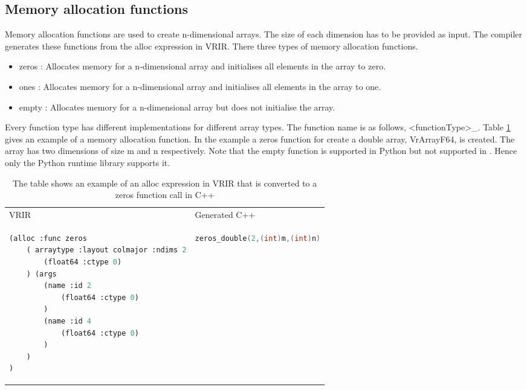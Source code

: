 \subsection{Memory allocation functions}
Memory allocation functions are used to create n-dimensional arrays. The size of each dimension has to be provided as input. The compiler generates these functions from the alloc expression in VRIR. There three types of memory allocation functions. 
\begin{itemize}
\item zeros : Allocates memory for a n-dimensional array and initialises all elements in the array to zero.
\item ones : Allocates memory for a n-dimensional array and initialises all elements in the array to one.
\item empty : Allocates memory for a n-dimensional array but does not initialise the array.
\end{itemize}
Every function type has different implementations for different array types. The function name is as follows, <functionType>\_<array type>. Table \ref{tab:allocFunc} gives an example of a memory allocation function. In the example a zeros function for create a \textsf{double} array, VrArrayF64, is created. The array has two dimensions of size \textsf{m} and \textsf{n} respectively. Note that the empty function is supported in Python but not supported in \matlab. Hence only the Python runtime library supports it.
\begin{table}[htbp]
\centering
\begin{tabular}{|l|l|}
\hline

VRIR &  Generated C++ \\
\hhline{|=|=|}
{
\begin{lstlisting}[language=lisp,frame=none, numbers=none]
(alloc :func zeros
	( arraytype :layout colmajor :ndims 2
		(float64 :ctype 0)
	) (args
		(name :id 2
			(float64 :ctype 0)
		)
		(name :id 4
			(float64 :ctype 0)
		)
	)
)
\end{lstlisting}
}
&
{
\begin{lstlisting}[language=c,frame=none, numbers=none]
 zeros_double(2,(int)m,(int)n)
\end{lstlisting}
} \\
\hline
\end{tabular}
\caption[Memory allocation example]{The table shows an example of an alloc expression in VRIR that is converted to a zeros function call in C++}
\label{tab:allocFunc}
\end{table}
